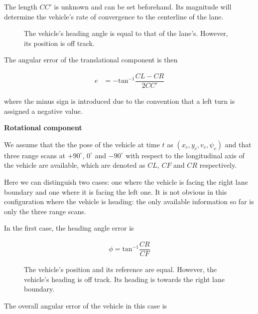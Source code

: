 \documentclass[oneside,12pt]{article}
\begin{document}
    The length $CC'$ is unknown and can be set beforehand. Its magnitude
    will determine the vehicle's rate of convergence to the centerline of the
    lane.

    \begin{figure}[H]\centering
      \scalebox{1}{}
      \caption{The vehicle's heading angle is equal to that of the lane's.
        However, its position is off track.}
      \label{fig:centerline_pid_translation}
    \end{figure}

    The angular error of the translational component is then

    \begin{align}
      e &= -\text{tan}^{-1}\dfrac{CL-CR}{2CC'}
    \end{align}

    where the minus sign is introduced due to the
    convention that a left turn is assigned a negative value.

    \textbf{Rotational component}


    We assume that the the pose of the vehicle at time $t$ as
    $(x_c, y_c, v_c, \psi_v)$ and that three range scans
    at $+90^\circ$, $0^\circ$ and $-90^\circ$ with respect to the
    longitudinal axis of the vehicle are available, which are denoted as
    $CL$, $CF$ and $CR$ respectively.

    Here we can distinguish two cases: one where the vehicle is facing the right
    lane boundary and one where it is facing the left one. It is not obvious
    in this configuration where the vehicle is heading: the only available
    information so far is only the three range scans.

    In the first case, the heading angle error is

    \begin{align}
      \phi = \text{tan}^{-1}\dfrac{CR}{CF}
    \end{align}

    \begin{figure}[H]\centering
      \scalebox{1}{}
      \caption{The vehicle's position and its reference are equal. However,
        the vehicle's heading is off track. Its heading is towards the right
        lane boundary.}
      \label{}
    \end{figure}

    The overall angular error of the vehicle in this case is
\end{document}
